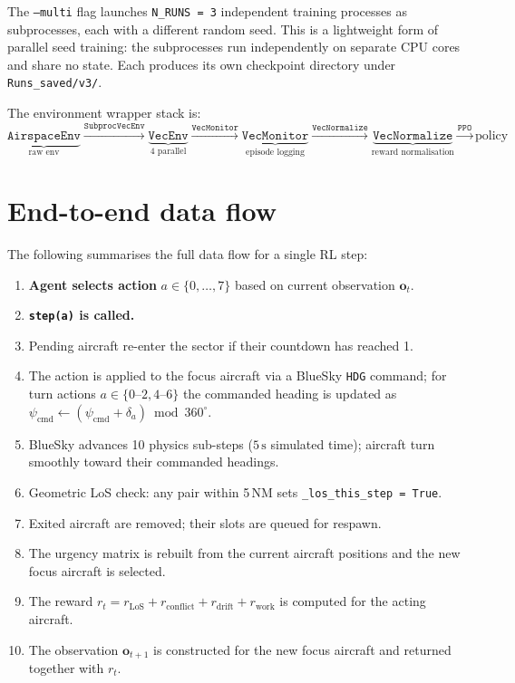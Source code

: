 \documentclass[11pt, a4paper]{article}
\begin{document}
The \texttt{--multi} flag launches \texttt{N\_RUNS = 3} independent training
processes as subprocesses, each with a different random seed.
This is a lightweight form of parallel seed training: the subprocesses run
independently on separate CPU cores and share no state.
Each produces its own checkpoint directory under \texttt{Runs\_saved/v3/}.

The environment wrapper stack is:
\[
  \underbrace{\texttt{AirspaceEnv}}_{\text{raw env}}
  \xrightarrow{\texttt{SubprocVecEnv}}
  \underbrace{\texttt{VecEnv}}_{\text{4 parallel}}
  \xrightarrow{\texttt{VecMonitor}}
  \underbrace{\texttt{VecMonitor}}_{\text{episode logging}}
  \xrightarrow{\texttt{VecNormalize}}
  \underbrace{\texttt{VecNormalize}}_{\text{reward normalisation}}
  \xrightarrow{\texttt{PPO}} \text{policy}
\]

\section{End-to-end data flow}

The following summarises the full data flow for a single RL step:

\begin{enumerate}
  \item \textbf{Agent selects action} $a \in \{0,\ldots,7\}$ based on current
        observation $\mathbf{o}_t$.
  \item \textbf{\texttt{step(a)} is called.}
  \item Pending aircraft re-enter the sector if their countdown has reached 1.
  \item The action is applied to the focus aircraft via a BlueSky \texttt{HDG}
        command; for turn actions $a \in \{0\text{--}2, 4\text{--}6\}$ the
        commanded heading is updated as
        $\psi_\text{cmd} \leftarrow (\psi_\text{cmd} + \delta_a) \bmod 360^\circ$.
  \item BlueSky advances 10 physics sub-steps ($5\,\text{s}$ simulated time);
        aircraft turn smoothly toward their commanded headings.
  \item Geometric LoS check: any pair within 5\,NM sets
        \texttt{\_los\_this\_step = True}.
  \item Exited aircraft are removed; their slots are queued for respawn.
  \item The urgency matrix is rebuilt from the current aircraft positions and
        the new focus aircraft is selected.
  \item The reward $r_t = r_\text{LoS} + r_\text{conflict} + r_\text{drift}
        + r_\text{work}$ is computed for the acting aircraft.
  \item The observation $\mathbf{o}_{t+1}$ is constructed for the new focus
        aircraft and returned together with $r_t$.
\end{enumerate}
\end{document}
